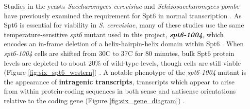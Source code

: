 Studies in the yeasts \textit{Saccharomyces cerevisiae} and \textit{Schizosaccharomyces pombe} have previously examined the requirement for Spt6 in normal transcription \citep{cheung2008, degennaro2013, kaplan2003, pathak2018, uwimana2017, vanbakel2013}.
As Spt6 is essential for viability in \textit{S. cerevisiae}, many of these studies use the same temperature-sensitive \textit{spt6} mutant used in this project, \textbf{\textit{spt6-1004}}, which encodes an in-frame deletion of a helix-hairpin-helix domain within Spt6 \citep{kaplan2003}.
When \textit{spt6-1004} cells are shifted from 30\textdegree C to 37\textdegree C for 80 minutes, bulk Spt6 protein levels are depleted to about 20\% of wild-type levels, though cells are still viable  (Figure \ref{fig:six_spt6_western}) \citep{kaplan2003}.
A notable phenotype of the \textit{spt6-1004} mutant is the appearance of \textbf{intragenic transcripts}, transcripts which appear to arise from within protein-coding sequences in both sense and antisense orientations relative to the coding gene (Figure \ref{fig:six_gene_diagram}) \citep{cheung2008, degennaro2013, kaplan2003, uwimana2017}.

